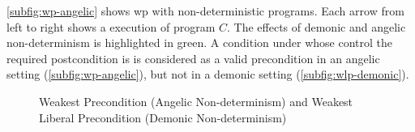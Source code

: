 \autoref{subfig:wp-angelic} shows wp with non-deterministic programs. 
Each arrow from left to right shows a  execution of program $C$. 
The effects of demonic and angelic non-determinism is highlighted in green. 
A condition under whose control the required postcondition is  is considered as a valid precondition in an angelic setting (\autoref{subfig:wp-angelic}), but not in a demonic setting (\autoref{subfig:wlp-demonic}). 


\begin{figure}[ht!]\centering
  \hfill
\caption{Weakest Precondition (Angelic Non-determinism) and Weakest Liberal Precondition (Demonic Non-determinism)}
\label{fig:wp-wlp-together}
\end{figure}





